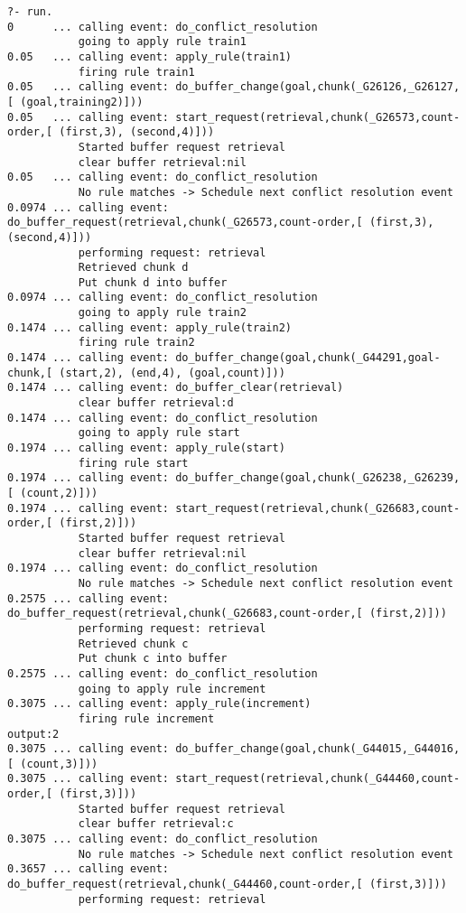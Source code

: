 \begin{lstlisting}
?- run.
0      ... calling event: do_conflict_resolution
           going to apply rule train1
0.05   ... calling event: apply_rule(train1)
           firing rule train1
0.05   ... calling event: do_buffer_change(goal,chunk(_G26126,_G26127,[ (goal,training2)]))
0.05   ... calling event: start_request(retrieval,chunk(_G26573,count-order,[ (first,3), (second,4)]))
           Started buffer request retrieval
           clear buffer retrieval:nil
0.05   ... calling event: do_conflict_resolution
           No rule matches -> Schedule next conflict resolution event
0.0974 ... calling event: do_buffer_request(retrieval,chunk(_G26573,count-order,[ (first,3), (second,4)]))
           performing request: retrieval
           Retrieved chunk d
           Put chunk d into buffer
0.0974 ... calling event: do_conflict_resolution
           going to apply rule train2
0.1474 ... calling event: apply_rule(train2)
           firing rule train2
0.1474 ... calling event: do_buffer_change(goal,chunk(_G44291,goal-chunk,[ (start,2), (end,4), (goal,count)]))
0.1474 ... calling event: do_buffer_clear(retrieval)
           clear buffer retrieval:d
0.1474 ... calling event: do_conflict_resolution
           going to apply rule start
0.1974 ... calling event: apply_rule(start)
           firing rule start
0.1974 ... calling event: do_buffer_change(goal,chunk(_G26238,_G26239,[ (count,2)]))
0.1974 ... calling event: start_request(retrieval,chunk(_G26683,count-order,[ (first,2)]))
           Started buffer request retrieval
           clear buffer retrieval:nil
0.1974 ... calling event: do_conflict_resolution
           No rule matches -> Schedule next conflict resolution event
0.2575 ... calling event: do_buffer_request(retrieval,chunk(_G26683,count-order,[ (first,2)]))
           performing request: retrieval
           Retrieved chunk c
           Put chunk c into buffer
0.2575 ... calling event: do_conflict_resolution
           going to apply rule increment
0.3075 ... calling event: apply_rule(increment)
           firing rule increment
output:2
0.3075 ... calling event: do_buffer_change(goal,chunk(_G44015,_G44016,[ (count,3)]))
0.3075 ... calling event: start_request(retrieval,chunk(_G44460,count-order,[ (first,3)]))
           Started buffer request retrieval
           clear buffer retrieval:c
0.3075 ... calling event: do_conflict_resolution
           No rule matches -> Schedule next conflict resolution event
0.3657 ... calling event: do_buffer_request(retrieval,chunk(_G44460,count-order,[ (first,3)]))
           performing request: retrieval

\end{lstlisting}
